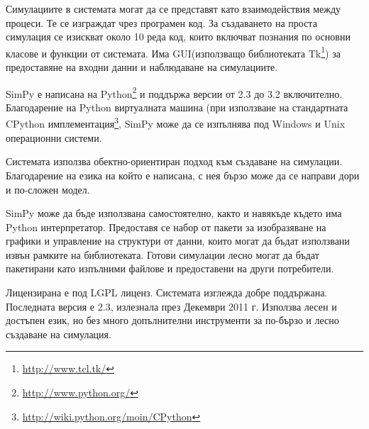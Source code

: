 			
				Симулациите в системата могат да се представят като взаимодействия между процеси. Те се изграждат чрез
				програмен код. За създаването на проста симулация се изискват около 10 реда код, 
				които включват познания по основни класове и функции от системата. Има GUI(използващо библиотеката 
				Tk\footnote{\url{http://www.tcl.tk/}}) за предоставяне на входни данни и наблюдаване на симулациите.						
			
			
				SimPy е написана на Python\footnote{\url{http://www.python.org/}} и поддържа версии от 2.3 до 3.2 включително.
				Благодарение на Python виртуалната машина (при използване на стандартната CPython 
				имплементация\footnote{\url{http://wiki.python.org/moin/CPython}}, SimPy може да се изпълнява под 
				Windows и Unix операционни системи.
			
			
				Системата използва обектно-ориентиран подход към създаване на симулации. Благодарение на езика на който е
				написана, с нея бързо може да се направи дори и по-сложен модел.
			
						
				SimPy може да бъде използвана самостоятелно, както и навякъде където има Python интерпретатор.
				Предоставя се набор от пакети за изобразяване на графики и управление на структури от данни, които могат
				да бъдат използвани извън рамките на библиотеката. Готови симулации лесно могат да бъдат пакетирани
				като изпълними файлове и предоставени на други потребители.

			
				Лицензирана е под LGPL лиценз. Системата изглежда добре поддържана. Последната версия е 2.3, излезнала през 
				Декември 2011 г. Използва лесен и достъпен език, но без много допълнителни инструменти за по-бързо и лесно
				създаване на симулация. \cite{SimPy}